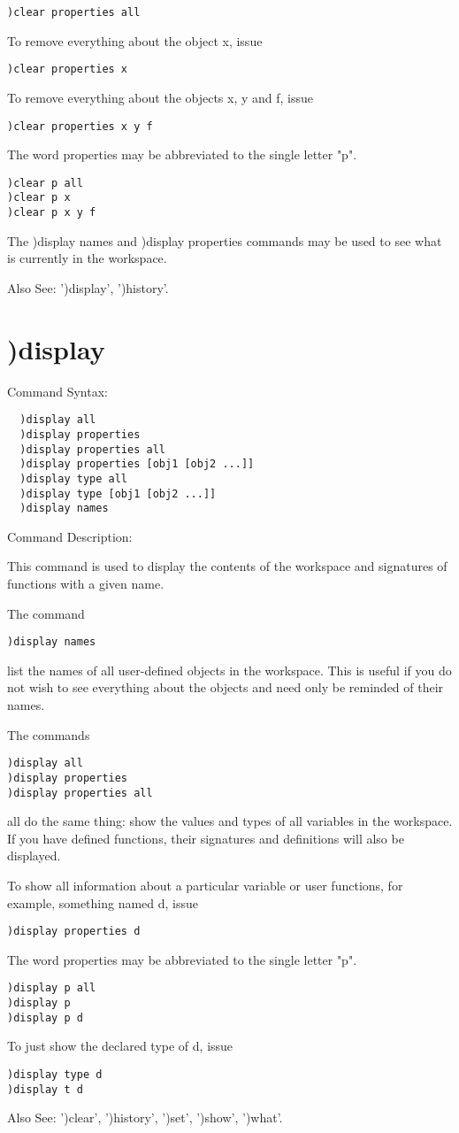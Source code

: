 \begin{verbatim}
)clear properties all
\end{verbatim}
To remove everything about the object x, issue
\begin{verbatim}
)clear properties x
\end{verbatim}

To remove everything about the objects x, y and f, issue
\begin{verbatim}
)clear properties x y f
\end{verbatim}
The word properties may be abbreviated to the single letter "p".
\begin{verbatim}
)clear p all
)clear p x
)clear p x y f
\end{verbatim}

The )display names and )display properties commands may be used to see what is currently in the workspace.

Also See: ')display', ')history'.

\section{)display}

Command Syntax:
\begin{verbatim}
  )display all
  )display properties
  )display properties all
  )display properties [obj1 [obj2 ...]]
  )display type all
  )display type [obj1 [obj2 ...]]
  )display names
\end{verbatim}
Command Description:

This command is used to display the contents of the workspace and signatures of functions with a given name.

The command
\begin{verbatim}
)display names
\end{verbatim}
list the names of all user-defined objects in the workspace. This is useful if you do not wish to see everything about the objects and need only be reminded of their names.

The commands
\begin{verbatim}
)display all
)display properties
)display properties all
\end{verbatim}
all do the same thing: show the values and types of all variables in the workspace. If you have defined functions, their signatures and definitions will also be displayed.

To show all information about a particular variable or user functions, for example, something named d, issue
\begin{verbatim}
)display properties d
\end{verbatim}
The word properties may be abbreviated to the single letter "p".
\begin{verbatim}
)display p all
)display p
)display p d
\end{verbatim}
To just show the declared type of d, issue
\begin{verbatim}
)display type d
)display t d
\end{verbatim}
Also See: ')clear', ')history', ')set', ')show', ')what'.

